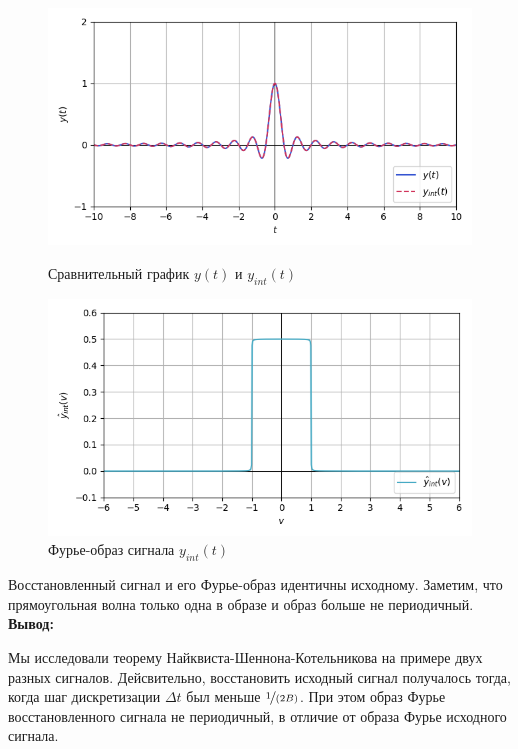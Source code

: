 \documentclass[a4paper]{article}
\begin{document}
\begin{figure}[H]
    \begin{minipage}{0.49\textwidth}
        \centering \includegraphics[width=\textwidth]{sources/second/sinc dt=0.25 B=2/5_y_cmp(interpolation).png}
        \caption{Сравнительный график $y(t)$ и $y_{int}(t)$}
    \end{minipage}\hfill
    \begin{minipage}{0.49\textwidth}
        \centering \includegraphics[width=\textwidth]{sources/second/sinc dt=0.25 B=2/7_interp_image.png}
        \caption{Фурье-образ сигнала $y_{int}(t)$}
    \end{minipage}
\end{figure}
Восстановленный сигнал и его Фурье-образ идентичны исходному. Заметим, что прямоугольная волна только одна в образе и образ больше не периодичный.\\[0.5em]
\textbf{Вывод:}
\begin{quotebox}
    Мы исследовали теорему Найквиста-Шеннона-Котельникова на примере двух разных сигналов. Дейсвительно, восстановить исходный сигнал получалось тогда, когда шаг дискретизации $\Delta t$ был меньше $\nicefrac{1}{(2B)}$. При этом образ Фурье восстановленного сигнала не периодичный, в отличие от образа Фурье исходного сигнала.
\end{quotebox}
\end{document}
